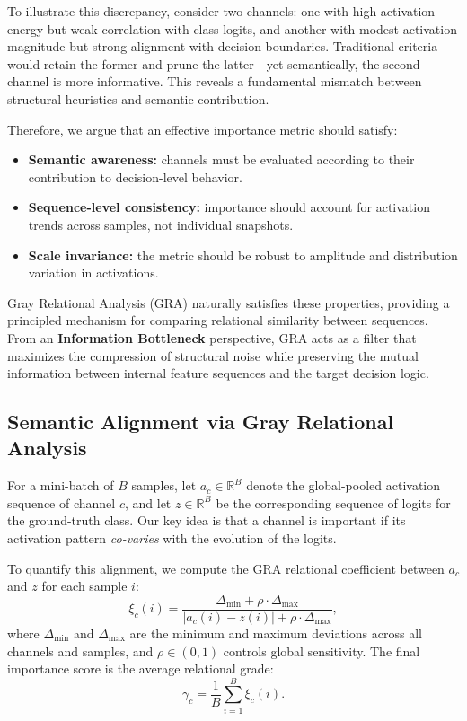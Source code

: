\documentclass[sn-mathphys,Numbered]{sn-jnl}
\begin{document}
To illustrate this discrepancy, consider two channels: one with high activation energy but weak correlation with class logits, and another with modest activation magnitude but strong alignment with decision boundaries. Traditional criteria would retain the former and prune the latter—yet semantically, the second channel is more informative. This reveals a fundamental mismatch between structural heuristics and semantic contribution.

Therefore, we argue that an effective importance metric should satisfy:
\begin{itemize}
    \item \textbf{Semantic awareness:} channels must be evaluated according to their contribution to decision-level behavior.
    \item \textbf{Sequence-level consistency:} importance should account for activation trends across samples, not individual snapshots.
    \item \textbf{Scale invariance:} the metric should be robust to amplitude and distribution variation in activations.
\end{itemize}

Gray Relational Analysis (GRA) naturally satisfies these properties, providing a principled mechanism for comparing relational similarity between sequences. From an \textbf{Information Bottleneck} perspective, GRA acts as a filter that maximizes the compression of structural noise while preserving the mutual information between internal feature sequences and the target decision logic.

\subsection{Semantic Alignment via Gray Relational Analysis}

For a mini-batch of $B$ samples, let $a_{c} \in \mathbb{R}^{B}$ denote the global-pooled activation sequence of channel $c$, and let $z \in \mathbb{R}^{B}$ be the corresponding sequence of logits for the ground-truth class. Our key idea is that a channel is important if its activation pattern \emph{co-varies} with the evolution of the logits.

To quantify this alignment, we compute the GRA relational coefficient between $a_{c}$ and $z$ for each sample $i$:
\begin{equation}
\xi_{c}(i) = \frac{\Delta_{\min} + \rho \cdot \Delta_{\max}}{\left|a_{c}(i) - z(i)\right| + \rho \cdot \Delta_{\max}},
\end{equation}
where $\Delta_{\min}$ and $\Delta_{\max}$ are the minimum and maximum deviations across all channels and samples, and $\rho \in (0,1)$ controls global sensitivity. The final importance score is the average relational grade:
\begin{equation}
\gamma_{c} = \frac{1}{B} \sum_{i=1}^{B} \xi_{c}(i).
\label{eq:gra_score}
\end{equation}
\end{document}
